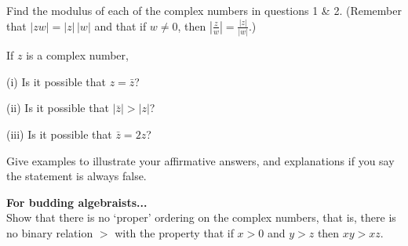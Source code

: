 \begin{prob}
\label{prob01.3} Find the modulus of each of the complex numbers in questions 1 \& 2. (Remember that $|z w|=|z|\, |w|$ and that if $w\not=0$, then $\displaystyle\left| \frac{z}{w} \right| = \frac{\left| z\right|}{\left|w\right|}$.) %

\end{prob}
\begin{prob}
\label{prob01.4}\sov   If $z$ is a complex number,

(i)  Is it possible that $z={\bar z}$?

(ii)  Is it possible that $|{\bar z}|>|z|$?

(iii)  Is it possible that ${\bar z}=2z$? 

\medskip Give  examples to illustrate your affirmative answers, and explanations if you say the statement is always false.
 \end{prob}






\begin{prob}
\label{prob01.5}
\textbf{For budding algebraists...}\\
Show that there is no `proper' ordering on the complex numbers, that is, there is no binary relation $>$ with the property that if $x>0$ and $y>z$ then $xy>xz$.
 \end{prob}